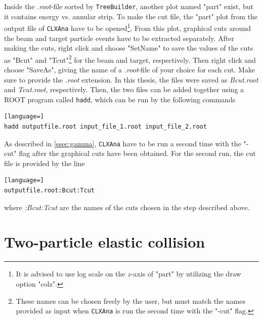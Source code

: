 \documentclass[twoside,english]{uiofysmaster/uiofysmaster}
\let\orgautoref\autoref
\renewcommand{\autoref}
        {%
		 \def\sectionautorefname{Section}%
		 \def\subsectionautorefname{Section}%
		 \def\subsubsectionautorefname{Section}%
		 \def\chapterautorefname{Chapter}%
          \orgautoref}
\begin{document}
\begin{appendices}
Inside the \textit{.root}-file sorted by \texttt{TreeBuilder}, another plot named "part" exist, but it contains energy vs. annular strip.
To make the cut file, the "part" plot from the output file of \texttt{CLXAna} have to be opened\footnote{It is advised to use log scale on the $z$-axis of "part" by utilizing the draw option "colz".}.
From this plot, graphical cuts around the beam and target particle events have to be extracted separately. 
After making the cuts, right click and choose "SetName" to save the values of the cuts as "Bcut" and "Tcut"\footnote{These names can be chosen freely by the user, but must match the names provided as input when \texttt{CLXAna} is run the second time with the "-cut" flag.} for the beam and target, respectively. 
Then right click and choose "SaveAs", giving the name of a \textit{.root}-file of your choice for each cut. 
Make sure to provide the \textit{.root} extension. 
In this thesis, the files were saved as \textit{Bcut.root} and \textit{Tcut.root}, respectively.
Then, the two files can be added together using a ROOT program called \texttt{hadd}, which can be run by the following commands
\begin{lstlisting}[language=]
hadd outputfile.root input_file_1.root input_file_2.root 
\end{lstlisting}


As described in \autoref{ssec:gamma}, \texttt{CLXAna} have to be run a second time with the "-cut" flag after the graphical cuts have been obtained. 
For the second run, the cut file is provided by the line
\begin{lstlisting}[language=]
outputfile.root:Bcut:Tcut
\end{lstlisting}
where \textit{:Bcut:Tcut} are the names of the cuts chosen in the step described above. 




\chapter{Two-particle elastic collision}\label{ch:scattering}

\end{appendices}
\end{document}
